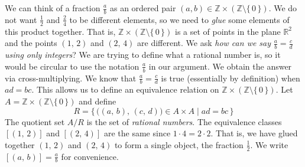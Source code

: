 \documentclass{article}
\theoremstyle{plain}
\theoremstyle{normal}
\newenvironment{example}{%
    \pushQED{\qed}\renewcommand{\qedsymbol}{$\blacksquare$}\examplex%
}{%
    \popQED\endexamplex%
}
\begin{document}
        \begin{example}
            We can think of a fraction $\frac{a}{b}$ as an ordered pair
            $(a,b)\in\mathbb{Z}\times(\mathbb{Z}\setminus\{\,0\,\})$. We do not
            want $\frac{1}{2}$ and $\frac{2}{4}$ to be different elements, so
            we need to \textit{glue} some elements of this product together.
            That is, $\mathbb{Z}\times(\mathbb{Z}\setminus\{\,0\,\})$ is a set
            of points in the plane $\mathbb{R}^{2}$ and the points
            $(1,\,2)$ and $(2,\,4)$ are different. We ask
            \textit{how can we say} $\frac{a}{b}=\frac{c}{d}$
            \textit{using only integers}? We are trying to define what a
            rational number is, so it would be circular to use the notation
            $\frac{a}{b}$ in our argument. We obtain the answer via
            cross-multiplying. We know that $\frac{a}{b}=\frac{c}{d}$ is true
            (essentially by definition) when $ad=bc$. This allows us to define
            an equivalence relation on
            $\mathbb{Z}\times(\mathbb{Z}\setminus\{\,0\,\})$. Let
            $A=\mathbb{Z}\times(\mathbb{Z}\setminus\{\,0\,\})$ and define
            \begin{equation}
                R=\{\,\big((a,\,b),\,(c,\,d)\big)\in{A}\times{A}\;|\;
                    ad=bc\,\}
            \end{equation}
            The quotient set $A/R$ is the set of \textit{rational numbers}.
            The equivalence classes $[(1,\,2)]$ and $[(2,\,4)]$ are the same
            since $1\cdot{4}=2\cdot{2}$. That is, we have glued together
            $(1,\,2)$ and $(2,\,4)$ to form a single object, the fraction
            $\frac{1}{2}$. We write $[(a,\,b)]=\frac{a}{b}$ for convenience.
        \end{example}
\end{document}
